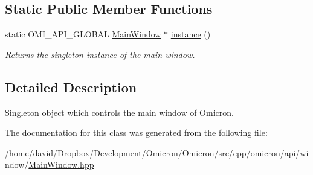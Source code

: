 \subsection*{Static Public Member Functions}
\begin{DoxyCompactItemize}
\item 
static O\+M\+I\+\_\+\+A\+P\+I\+\_\+\+G\+L\+O\+B\+AL \hyperlink{classomi_1_1window_1_1_main_window}{Main\+Window} $\ast$ \hyperlink{classomi_1_1window_1_1_main_window_a70da804588730859dd1227cee0c2e6c5}{instance} ()\hypertarget{classomi_1_1window_1_1_main_window_a70da804588730859dd1227cee0c2e6c5}{}\label{classomi_1_1window_1_1_main_window_a70da804588730859dd1227cee0c2e6c5}

\begin{DoxyCompactList}\small\item\em Returns the singleton instance of the main window. \end{DoxyCompactList}\end{DoxyCompactItemize}


\subsection{Detailed Description}
Singleton object which controls the main window of Omicron. 

The documentation for this class was generated from the following file\+:\begin{DoxyCompactItemize}
\item 
/home/david/\+Dropbox/\+Development/\+Omicron/\+Omicron/src/cpp/omicron/api/window/\hyperlink{_main_window_8hpp}{Main\+Window.\+hpp}\end{DoxyCompactItemize}
